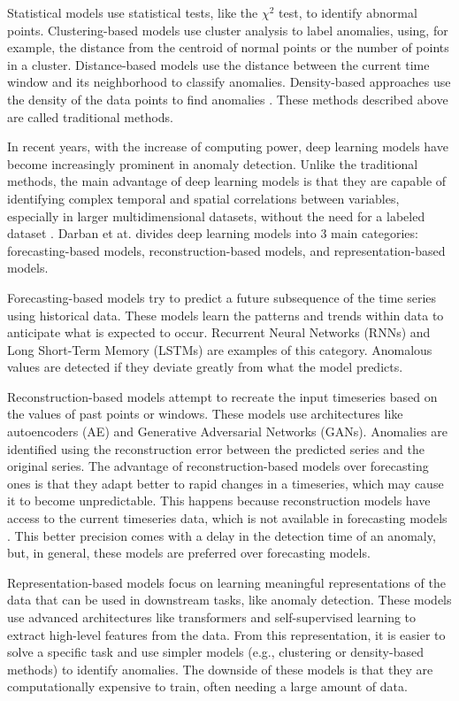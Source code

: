 Statistical models use statistical tests, like the $\chi^2$ test, to identify abnormal points. Clustering-based models use cluster analysis to label anomalies, using, for example, the distance from the centroid of normal points or the number of points in a cluster. Distance-based models use the distance between the current time window and its neighborhood to classify anomalies. Density-based approaches use the density of the data points to find anomalies \cite{Samariya_Thakkar_2021}. These methods described above are called traditional methods.

In recent years, with the increase of computing power, deep learning models have become increasingly prominent in anomaly detection. Unlike the traditional methods, the main advantage of deep learning models is that they are capable of identifying complex temporal and spatial correlations between variables, especially in larger multidimensional datasets, without the need for a labeled dataset \cite{Choi_Yi_Park_Yoon_2021}. Darban et at. \cite{Zamanzadeh_Darban_Webb_Pan_Aggarwal_Salehi_2024} divides deep learning models into 3 main categories: forecasting-based models, reconstruction-based models, and representation-based models.

Forecasting-based models try to predict a future subsequence of the time series using historical data. These models learn the patterns and trends within data to anticipate what is expected to occur. Recurrent Neural Networks (RNNs) and Long Short-Term Memory (LSTMs) are examples of this category. Anomalous values are detected if they deviate greatly from what the model predicts.

Reconstruction-based models attempt to recreate the input timeseries based on the values of past points or windows. These models use architectures like autoencoders (AE) and Generative Adversarial Networks (GANs). Anomalies are identified using the reconstruction error between the predicted series and the original series. The advantage of reconstruction-based models over forecasting ones is that they adapt better to rapid changes in a timeseries, which may cause it to become unpredictable. This happens because reconstruction models have access to the current timeseries data, which is not available in forecasting models \cite{Zamanzadeh_Darban_Webb_Pan_Aggarwal_Salehi_2024}. This better precision comes with a delay in the detection time of an anomaly, but, in general, these models are preferred over forecasting models.

Representation-based models focus on learning meaningful representations of the data that can be used in downstream tasks, like anomaly detection.  These models use advanced architectures like transformers and self-supervised learning to extract high-level features from the data. From this representation, it is easier to solve a specific task and use simpler models (e.g., clustering or density-based methods) to identify anomalies. The downside of these models is that they are computationally expensive to train, often needing a large amount of data.

